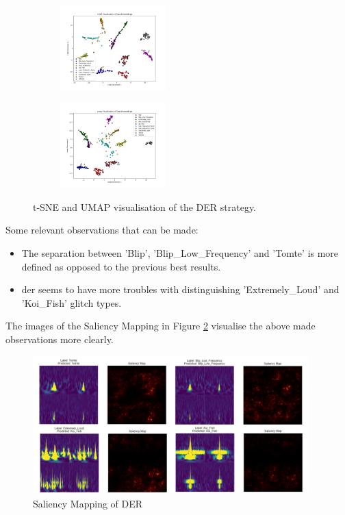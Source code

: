 \begin{figure}[ht]
\centering
\begin{subfigure}
    \centering
    \includegraphics[width=0.45\textwidth]{Images/tSNE_DER_MultiView_testset_100epochs.png}
\end{subfigure}
\begin{subfigure}
    \centering
    \includegraphics[width=0.45\textwidth]{Images/umap_MultiView_DER_testset_100epochs.png}
\end{subfigure}
    \caption{t-SNE and UMAP visualisation of the DER strategy.}
    \label{fig:tsne_umap_der}
\end{figure}

Some relevant observations that can be made: 
\begin{itemize}
    \item The separation between 'Blip', 'Blip\_Low\_Frequency' and 'Tomte' is more defined as opposed to the previous best results. 
    \item \acrshort{der} seems to have more troubles with distinguishing 'Extremely\_Loud' and 'Koi\_Fish' glitch types. 
\end{itemize}

The images of the Saliency Mapping in Figure \ref{fig:saliency_der} visualise the above made observations more clearly. 

\begin{figure}[ht]
    \centering
    \includegraphics[width=0.95\textwidth]{Grad Assignment/Images/SaliencyMapping_DER_MultiView_100epochs_selection.png}
    \caption{Saliency Mapping of DER}
    \label{fig:saliency_der}
\end{figure}
\newpage

